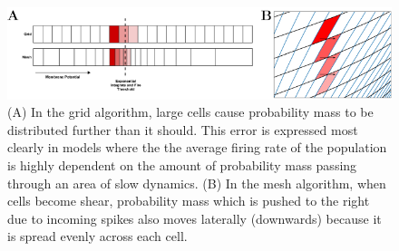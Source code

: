 \documentclass[utf8]{frontiersSCNS} %
\begin{document}
\begin{figure}[tb!]
  \centering
    \includegraphics[width=\linewidth]{images/error_full_figure.pdf}
  \caption{(A) In the grid algorithm, large cells cause probability mass to be distributed further than it should. This error is expressed most clearly in models where the the average firing rate of the population is highly dependent on the amount of probability mass passing through an area of slow dynamics. (B) In the mesh algorithm, when cells become shear, probability mass which is pushed to the right due to incoming spikes also moves laterally (downwards) because it is spread evenly across each cell.}
  \label{fig:meshissue}
\end{figure}
\end{document}
